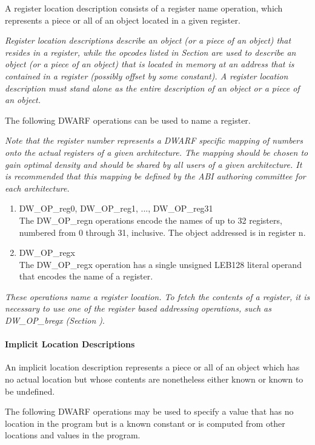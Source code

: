 A register location description consists of a register name
operation, which represents a piece or all of an object
located in a given register.

\textit{Register location descriptions describe an object
(or a piece of an object) that resides in a register, while
the opcodes listed in 
Section 
are used to describe an object (or a piece of
an object) that is located in memory at an address that is
contained in a register (possibly offset by some constant). A
register location description must stand alone as the entire
description of an object or a piece of an object.
}

The following DWARF operations can be used to name a register.


\textit{Note that the register number represents a DWARF specific
mapping of numbers onto the actual registers of a given
architecture. The mapping should be chosen to gain optimal
density and should be shared by all users of a given
architecture. It is recommended that this mapping be defined
by the ABI authoring committee for each architecture.
}
\begin{enumerate}[1]
\item DW\_OP\_reg0, DW\_OP\_reg1, ..., DW\_OP\_reg31 \\
The DW\_OP\_regn operations encode the names of up to 32
registers, numbered from 0 through 31, inclusive. The object
addressed is in register n.

\item DW\_OP\_regx \\
The DW\_OP\_regx operation has a single unsigned LEB128 literal
operand that encodes the name of a register.  
\end{enumerate}

\textit{These operations name a register location. To
fetch the contents of a register, it is necessary to use
one of the register based addressing operations, such as
DW\_OP\_bregx 
(Section )}.


\paragraph{Implicit Location Descriptions}

An implicit location description represents a piece or all
of an object which has no actual location but whose contents
are nonetheless either known or known to be undefined.

The following DWARF operations may be used to specify a value
that has no location in the program but is a known constant
or is computed from other locations and values in the program.

